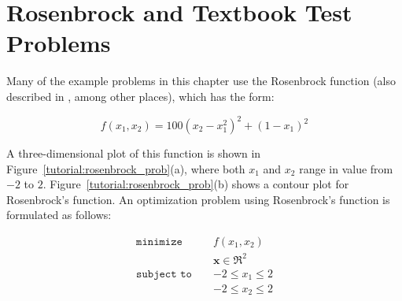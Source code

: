  
\section{Rosenbrock and Textbook Test Problems}\label{tutorial:rosenbrock}

Many of the example problems in this chapter use the Rosenbrock
function \cite{Rosenbrock60} (also described in \cite{Gil81}, among
other places), which has the form:

\begin{equation}
f(x_1,x_2)=100(x_2-x_1^2)^2+(1-x_1)^2 \label{tutorial:rosen}
\end{equation}

A three-dimensional plot of this function is shown in
Figure~\ref{tutorial:rosenbrock_prob}(a), where both $x_1$ and
$x_2$ range in value from $-2$ to $2$.
Figure~\ref{tutorial:rosenbrock_prob}(b) shows a contour plot
for Rosenbrock's function. An optimization problem using Rosenbrock's
function is formulated as follows:

\begin{eqnarray}
\texttt{minimize }   & & f(x_1,x_2)          \nonumber\\
                     & & \mathbf{x} \in \Re^2\nonumber\\
\texttt{subject to } & & -2 \le x_1 \le 2    \\
                     & & -2 \le x_2 \le 2    \nonumber
\end{eqnarray}

